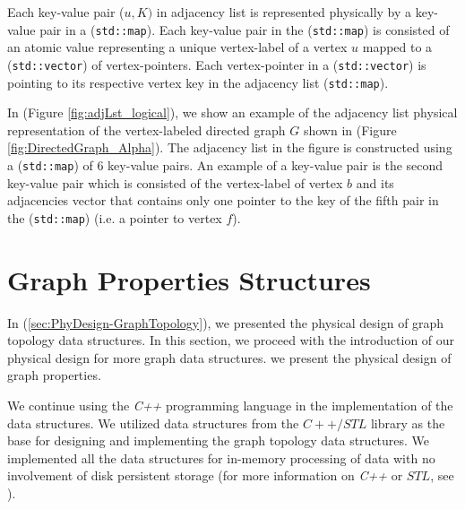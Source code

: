 {Each key-value pair ($u,K)$ in adjacency list is represented physically by a key-value pair in a (\texttt{std::map}). Each key-value pair in the (\texttt{std::map}) is consisted of an atomic value representing a unique vertex-label of a vertex $u$ mapped to a (\texttt{std::vector}) of vertex-pointers. Each vertex-pointer in a (\texttt{std::vector}) is pointing to its respective vertex key in the adjacency list (\texttt{std::map}).


In (Figure \ref{fig:adjLst_logical}), we show an example of the adjacency list physical representation of the vertex-labeled directed graph $G$ shown in (Figure \ref{fig:DirectedGraph_Alpha}). The adjacency list in the figure is constructed using a (\texttt{std::map}) of 6 key-value pairs. An example of a key-value pair is the second key-value pair which is consisted of the vertex-label of vertex $b$ and its adjacencies vector that contains only one pointer to the key of the fifth pair in the (\texttt{std::map}) (i.e. a pointer to vertex $f$).

\section{Graph Properties Structures}
\label{sec:PhyDesign-GraphProperties}

In (\ref{sec:PhyDesign-GraphTopology}), we presented the physical design of graph topology data structures. In this section, we proceed with the introduction of our physical design for more graph data structures. we present the physical design of graph properties.

We continue using the \textit{C++} programming language in the implementation of the data structures. We utilized data structures from the $C++/STL$ library as the base for designing and implementing the graph topology data structures. We implemented all the data structures for in-memory processing of data with no involvement of disk persistent storage (for more information on \textit{C++} or $STL$, see \cite{josuttis2012c++}).

}
